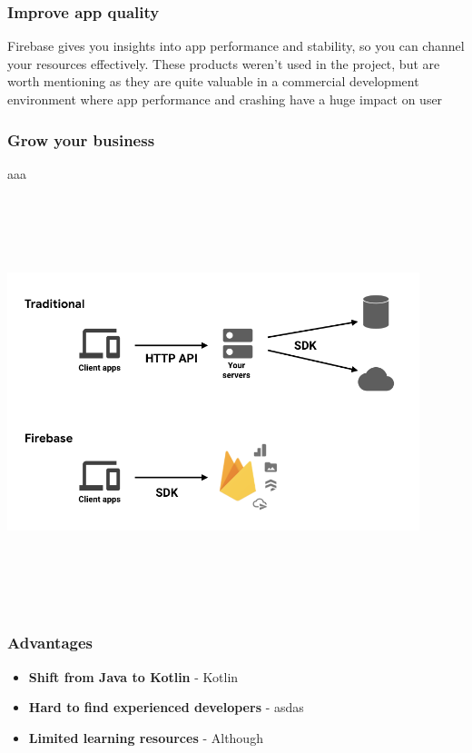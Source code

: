 \newpage
\subsubsection{Improve app quality}
Firebase gives you insights into app performance and stability, so you can channel your resources effectively.
These products weren't used in the project, but are worth mentioning as they are quite valuable in a commercial development environment where app performance and crashing have a huge impact on user
\subsubsection{Grow your business}
aaa
\begin{center}
    \includegraphics[width=12cm,height=12cm,keepaspectratio]{Images/firebasetradpic.png}
\end{center}


\subsubsection{Advantages}
\begin{itemize}
    \item \textbf{Shift from Java to Kotlin} - Kotlin
    \item \textbf{Hard to find experienced developers} - asdas
    \item \textbf{Limited learning resources} - Although
\end{itemize}
